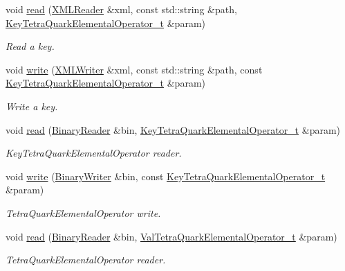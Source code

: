 \begin{DoxyCompactItemize}
void \mbox{\hyperlink{namespaceHadron_ab1a8a0ffcdeeae3ff66ed453c1609de7}{read}} (\mbox{\hyperlink{classADATXML_1_1XMLReader}{X\+M\+L\+Reader}} \&xml, const std\+::string \&path, \mbox{\hyperlink{structHadron_1_1KeyTetraQuarkElementalOperator__t}{Key\+Tetra\+Quark\+Elemental\+Operator\+\_\+t}} \&param)
\begin{DoxyCompactList}\small\item\em Read a key. \end{DoxyCompactList}\item 
void \mbox{\hyperlink{namespaceHadron_a4b91e53beed52be0c8431a4464285dfd}{write}} (\mbox{\hyperlink{classADATXML_1_1XMLWriter}{X\+M\+L\+Writer}} \&xml, const std\+::string \&path, const \mbox{\hyperlink{structHadron_1_1KeyTetraQuarkElementalOperator__t}{Key\+Tetra\+Quark\+Elemental\+Operator\+\_\+t}} \&param)
\begin{DoxyCompactList}\small\item\em Write a key. \end{DoxyCompactList}\item 
void \mbox{\hyperlink{namespaceHadron_a10d99bb52996f8aec8a87612e98d5684}{read}} (\mbox{\hyperlink{classADATIO_1_1BinaryReader}{Binary\+Reader}} \&bin, \mbox{\hyperlink{structHadron_1_1KeyTetraQuarkElementalOperator__t}{Key\+Tetra\+Quark\+Elemental\+Operator\+\_\+t}} \&param)
\begin{DoxyCompactList}\small\item\em Key\+Tetra\+Quark\+Elemental\+Operator reader. \end{DoxyCompactList}\item 
void \mbox{\hyperlink{namespaceHadron_a4fefcfe0419c7e64ff031011643eb810}{write}} (\mbox{\hyperlink{classADATIO_1_1BinaryWriter}{Binary\+Writer}} \&bin, const \mbox{\hyperlink{structHadron_1_1KeyTetraQuarkElementalOperator__t}{Key\+Tetra\+Quark\+Elemental\+Operator\+\_\+t}} \&param)
\begin{DoxyCompactList}\small\item\em Tetra\+Quark\+Elemental\+Operator write. \end{DoxyCompactList}\item 
void \mbox{\hyperlink{namespaceHadron_a614faa9c1c7ae1880f009d5c9aa672ec}{read}} (\mbox{\hyperlink{classADATIO_1_1BinaryReader}{Binary\+Reader}} \&bin, \mbox{\hyperlink{structHadron_1_1ValTetraQuarkElementalOperator__t}{Val\+Tetra\+Quark\+Elemental\+Operator\+\_\+t}} \&param)
\begin{DoxyCompactList}\small\item\em Tetra\+Quark\+Elemental\+Operator reader. \end{DoxyCompactList}\item 

\end{DoxyCompactItemize}
